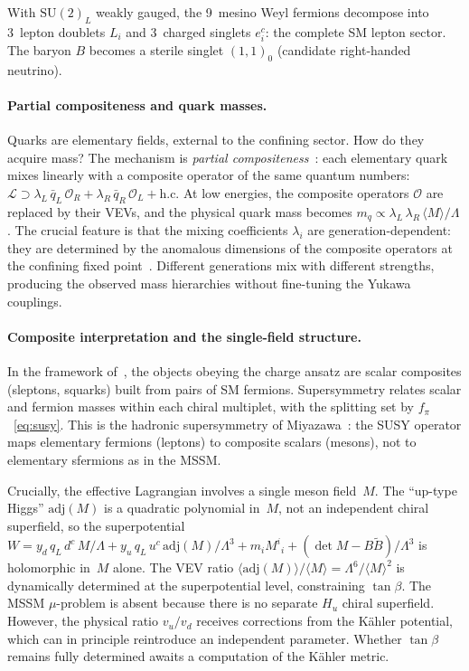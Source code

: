 \documentclass[12pt,a4paper]{article}
\newcommand{\SU}{\mathrm{SU}}
\newcommand{\adj}{\mathrm{adj}}
\begin{document}
With $\SU(2)_L$ weakly gauged, the 9~mesino Weyl fermions
decompose into 3~lepton doublets $L_i$ and 3~charged singlets $e^c_i$:
the complete SM lepton sector.  The baryon $B$ becomes a sterile
singlet $(1,1)_0$ (candidate right-handed neutrino).

\paragraph{Partial compositeness and quark masses.}
Quarks are elementary fields, external to the confining sector.
How do they acquire mass?  The mechanism is \emph{partial
compositeness}~\cite{Kaplan:1991dc}: each elementary quark mixes
linearly with a composite operator of the same quantum numbers:
$\mathcal{L} \supset \lambda_L\,\bar q_L\,\mathcal{O}_R
+ \lambda_R\,\bar q_R\,\mathcal{O}_L + \text{h.c.}$
At low energies, the composite operators $\mathcal{O}$ are replaced
by their VEVs, and the physical quark mass becomes
$m_q \propto \lambda_L\,\lambda_R\,\langle M\rangle/\Lambda$.
The crucial feature is that the mixing coefficients $\lambda_i$
are generation-dependent: they are determined by the anomalous
dimensions of the composite operators at the confining fixed
point~\cite{Strassler:1995,NelsonStrassler:2000}.
Different generations mix with different strengths, producing the
observed mass hierarchies without fine-tuning the Yukawa couplings.

\paragraph{Composite interpretation and the single-field structure.}
In the framework of~\cite{Rivero:2024epjc}, the objects obeying the
charge ansatz are scalar composites (sleptons, squarks) built
from pairs of SM fermions. Supersymmetry relates scalar and fermion
masses within each chiral multiplet, with the splitting set by
$f_\pi$~\eqref{eq:susy}. This is the hadronic supersymmetry of
Miyazawa~\cite{Miyazawa:1966}: the SUSY operator maps elementary
fermions (leptons) to composite scalars (mesons), not to elementary
sfermions as in the MSSM.

Crucially, the effective Lagrangian involves a single meson field~$M$.
The ``up-type Higgs'' $\adj(M)$ is a quadratic polynomial in~$M$,
not an independent chiral superfield, so the superpotential
$W = y_d\,q_L\,d^c\,M/\Lambda + y_u\,q_L\,u^c\,\adj(M)/\Lambda^3
+ m_i M^i{}_i + (\det M - B\tilde B)/\Lambda^3$
is holomorphic in~$M$ alone. The VEV ratio
$\langle\adj(M)\rangle/\langle M\rangle = \Lambda^6/\langle M\rangle^2$
is dynamically determined at the superpotential level,
constraining $\tan\beta$. The MSSM $\mu$-problem is absent
because there is no separate $H_u$ chiral superfield.
However, the physical ratio $v_u/v_d$ receives corrections
from the K\"ahler potential, which can in principle reintroduce
an independent parameter. Whether $\tan\beta$ remains fully
determined awaits a computation of the K\"ahler metric.
\end{document}
